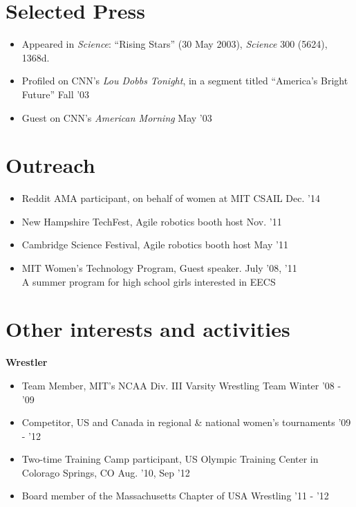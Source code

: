 \documentclass[margin]{res}
\begin{document}
\begin{resume}
\section{Selected Press}
\begin{itemize}[leftmargin=*] \itemsep -2pt
\item Appeared in \textit{Science}: ``Rising Stars'' (30 May 2003), \textit{Science} 300 (5624), 1368d.
\item Profiled on CNN's \textit{Lou Dobbs Tonight}, in a segment titled ``America's Bright Future''  \hfill Fall '03 
\item Guest on CNN's \textit{American Morning} \hfill May '03
\end{itemize}

\section{Outreach}
\begin{itemize}[leftmargin=*] \itemsep -2pt
\item Reddit AMA participant, on behalf of women at MIT CSAIL \hfill Dec. '14
\item New Hampshire TechFest, Agile robotics booth host \hfill Nov. '11
\item Cambridge Science Festival, Agile robotics booth host \hfill May '11
\item MIT Women's Technology Program, Guest speaker. \hfill July '08, '11 \\
A summer program for high school girls interested in EECS
\end{itemize}

\section{Other interests and activities}
{\bf Wrestler}
\begin{itemize}[leftmargin=*] \itemsep -2pt
\item Team Member, MIT's NCAA Div. III Varsity Wrestling Team \hfill Winter '08 - '09
\item Competitor, US and Canada in regional \& national women's tournaments \hfill '09 - '12
\item Two-time Training Camp participant, US Olympic Training Center in Colorago Springs, CO \hfill Aug. '10, Sep '12
\item Board member of the Massachusetts Chapter of USA Wrestling \hfill '11 - '12


\end{itemize}

\end{resume} 
 
\end{document}
